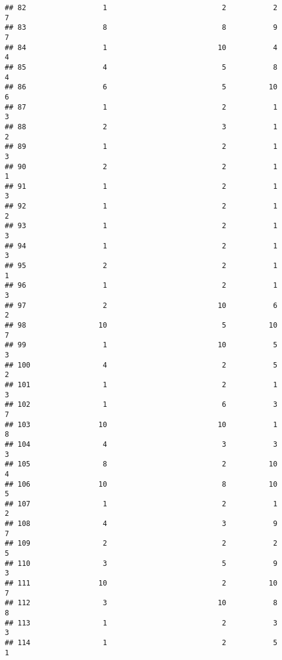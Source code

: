 \documentclass[
]{article}
\begin{document}
\begin{verbatim}
## 82                  1                           2           2               7
## 83                  8                           8           9               7
## 84                  1                          10           4               4
## 85                  4                           5           8               4
## 86                  6                           5          10               6
## 87                  1                           2           1               3
## 88                  2                           3           1               2
## 89                  1                           2           1               3
## 90                  2                           2           1               1
## 91                  1                           2           1               3
## 92                  1                           2           1               2
## 93                  1                           2           1               3
## 94                  1                           2           1               3
## 95                  2                           2           1               1
## 96                  1                           2           1               3
## 97                  2                          10           6               2
## 98                 10                           5          10               7
## 99                  1                          10           5               3
## 100                 4                           2           5               2
## 101                 1                           2           1               3
## 102                 1                           6           3               7
## 103                10                          10           1               8
## 104                 4                           3           3               3
## 105                 8                           2          10               4
## 106                10                           8          10               5
## 107                 1                           2           1               2
## 108                 4                           3           9               7
## 109                 2                           2           2               5
## 110                 3                           5           9               3
## 111                10                           2          10               7
## 112                 3                          10           8               8
## 113                 1                           2           3               3
## 114                 1                           2           5               1

\end{verbatim}
\end{document}
